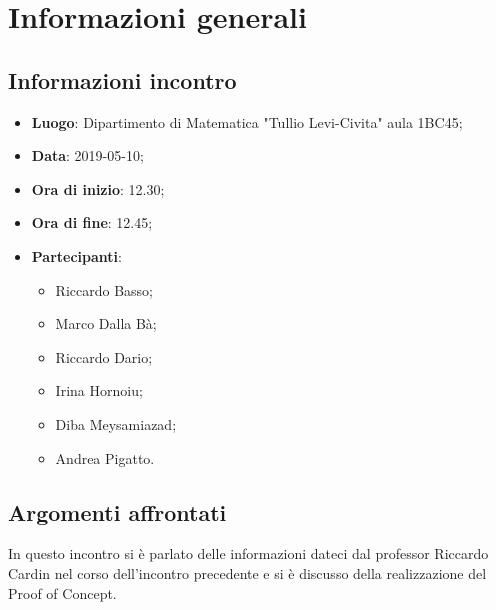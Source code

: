 \section{Informazioni generali}

\subsection{Informazioni incontro}
\begin{itemize}
	\item \textbf{Luogo}: Dipartimento di Matematica "Tullio Levi-Civita" aula 1BC45;
	\item \textbf{Data}: 2019-05-10;
	\item \textbf{Ora di inizio}: 12.30;
	\item \textbf{Ora di fine}: 12.45;
	\item \textbf{Partecipanti}: 
	\begin{itemize}
		\item Riccardo Basso;
		\item Marco Dalla Bà;
		\item Riccardo Dario;
		\item Irina Hornoiu;
		\item Diba Meysamiazad;
		\item Andrea Pigatto.	
	\end{itemize}
\end{itemize}

\subsection{Argomenti affrontati}
In questo incontro si è parlato delle informazioni dateci dal professor Riccardo Cardin nel corso dell'incontro precedente e si è discusso della realizzazione del Proof of Concept.
